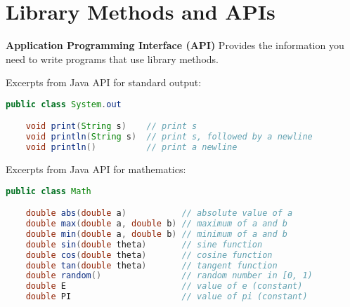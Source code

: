\documentclass[8pt,a4paper,compress]{beamer}
\begin{document}
\section{Library Methods and APIs}
\begin{frame}[fragile]
\pause
\textbf{Application Programming Interface (API)} Provides the information you need to write programs that use library methods.

\pause
\smallskip

Excerpts from Java API for standard output:
\begin{lstlisting}[language=Java]
public class System.out

    void print(String s)    // print s
    void println(String s)  // print s, followed by a newline
    void println()          // print a newline
\end{lstlisting}

\pause
\smallskip

Excerpts from Java API for mathematics:
\begin{lstlisting}[language=Java]
public class Math

    double abs(double a)           // absolute value of a
    double max(double a, double b) // maximum of a and b
    double min(double a, double b) // minimum of a and b
    double sin(double theta)       // sine function
    double cos(double theta)       // cosine function
    double tan(double theta)       // tangent function
    double random()                // random number in [0, 1)
    double E                       // value of e (constant)
    double PI                      // value of pi (constant)
\end{lstlisting}

\end{frame}
\end{document}
